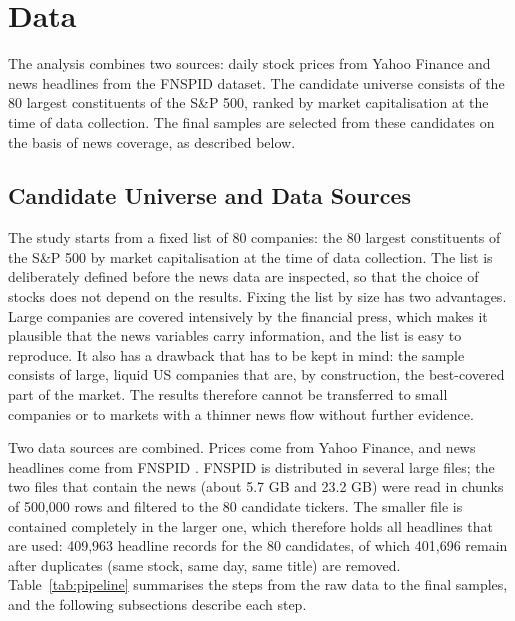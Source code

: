 \documentclass[12pt,a4paper]{article}
\begin{document}


\section{Data}\label{sec:data}
The analysis combines two sources: daily stock prices from Yahoo Finance and news headlines from the FNSPID dataset. The candidate universe consists of the 80 largest constituents of the S\&P 500, ranked by market capitalisation at the time of data collection. The final samples are selected from these candidates on the basis of news coverage, as described below.

\subsection{Candidate Universe and Data Sources}\label{sec:data-universe}
The study starts from a fixed list of 80 companies: the 80 largest constituents of the S\&P 500 by market capitalisation at the time of data collection. The list is deliberately defined before the news data are inspected, so that the choice of stocks does not depend on the results. Fixing the list by size has two advantages. Large companies are covered intensively by the financial press, which makes it plausible that the news variables carry information, and the list is easy to reproduce. It also has a drawback that has to be kept in mind: the sample consists of large, liquid US companies that are, by construction, the best-covered part of the market. The results therefore cannot be transferred to small companies or to markets with a thinner news flow without further evidence.

Two data sources are combined. Prices come from Yahoo Finance, and news headlines come from FNSPID \parencite{dong2024}. FNSPID is distributed in several large files; the two files that contain the news (about 5.7 GB and 23.2 GB) were read in chunks of 500,000 rows and filtered to the 80 candidate tickers. The smaller file is contained completely in the larger one, which therefore holds all headlines that are used: 409,963 headline records for the 80 candidates, of which 401,696 remain after duplicates (same stock, same day, same title) are removed. Table~\ref{tab:pipeline} summarises the steps from the raw data to the final samples, and the following subsections describe each step.
\end{document}
